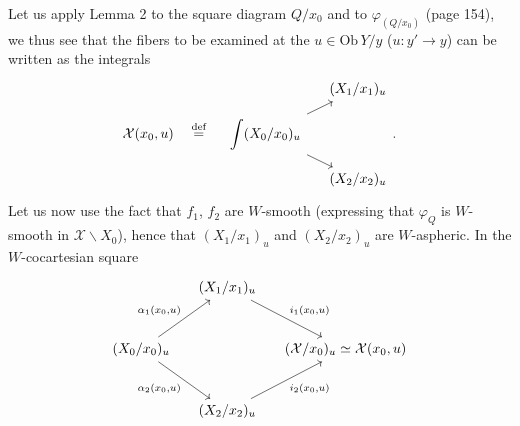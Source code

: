 \documentclass[11pt]{article}
\newcommand{\intdiag}[3]{\begin{tikzcd}[row sep=small,column sep=small,ampersand replacement=\&,baseline=(\tikzcdmatrixname-2-1.base)]
 \& #2 \\
 \displaystyle\int #1 \arrow[ur] \arrow[dr] \& \\
 \& #3
\end{tikzcd}}
\begin{document}
Let us apply Lemma 2 to the square diagram $Q/x_0$ and to $\varphi_{(Q/x_0)}$ (page 154), we thus see that the fibers to be examined at the $u\in\mathrm{Ob}\,Y/y$ ($u : y'\longrightarrow y$) can be written as the integrals
\[
\mathcal{X}(x_0,u) \quad\overset{\text{def}}{=}\quad \intdiag{(X_0/x_0)_u}{(X_1/x_1)_u}{(X_2/x_2)_u} .
\]
Let us now use the fact that $f_1$, $f_2$ are $W$-smooth (expressing that $\varphi_Q$ is $W$-smooth in $\mathcal{X}\backslash X_0$), hence that $(X_1/x_1)_u$ and $(X_2/x_2)_u$ are $W$-aspheric. In the $W$-cocartesian square
\[
\begin{tikzcd}[row sep=large,column sep=small]
 & (X_1/x_1)_u \arrow[dr, "{i_1(x_0,u)}"] & \\
(X_0/x_0)_u \arrow[ur, "{\alpha_1(x_0,u)}"] \arrow[dr, "{\alpha_2(x_0,u)}"'] & & (\mathcal{X}/x_0)_u\simeq\mathcal{X}(x_0,u) \\
 & (X_2/x_2)_u \arrow[ur, "{i_2(x_0,u)}"'] &
\end{tikzcd}
\]
\end{document}
